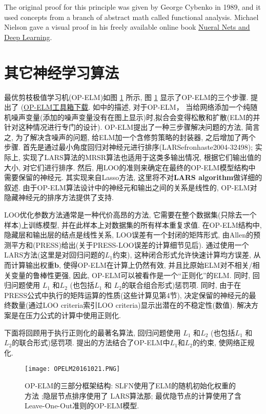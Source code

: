 The original proof for this principle was given by George Cybenko in 1989, and it used concepts from a branch of abstract math called functional analysis. Michael Nielson gave a visual proof in his freely available online book \href{http://neuralnetworksanddeeplearning.com/chap4.html}{Nueral Nets and Deep Learning}.
\section{其它神经学习算法}
最优剪枝极值学习机(OP-ELM)如图 \ref{OPELM20161021fig2} 所示, 图 \ref{OPELM20161021fig2} 显示了OP-ELM的三个步骤.
提出了 (\href{http://www.cis.hut.fi/projects/eiml/research/download}{OP-ELM工具箱下载}.
如\cite{Miche2008OP, Miche2008A, Miche2010OP}中的描述, 对于OP-ELM， 当给网络添加一个纯随机噪声变量(添加的噪声变量没有在图上显示)时,拟合会变得松散和扩散(ELM的并针对这种情况进行专门的设计).
OP-ELM提出了一种三步骤解决问题的方法, 简言之, 为了解决含噪声的问题, 给ELM加一个含修剪策略的封装器, 之后增加了两个步骤.
首先是通过最小角度回归对神经元进行排序(LARS{efronhaste2004-32498});
实际上, 实现了LARS算法的MRSR算法\cite{SimiläTikka2005-32497}也适用于这类多输出情况, 根据它们输出值的大小, 对它们进行排序.
然后, 用LOO的准则来确定在最终的OP-ELM模型结构中需要保留的神经元.
其实现来自Lasso方法, 这里将不对\textbf{LARS algorithm}做详细的叙述.
由于OP-ELM算法设计中的神经元和输出之间的关系是线性的, OP-ELM对隐藏神经元的排序方法提供了支持.

LOO优化参数方法通常是一种代价高昂的方法, 它需要在整个数据集(只除去一个样本)上训练模型, 并在此样本上对数据集的所有样本重复求值.
在OP-ELM结构中, 隐藏层和输出层的结点是线性关系, LOO误差有一个封闭的矩阵形式, 由Allen的预测平方和(PRESS)给出(关于PRESS-LOO误差的计算细节见后).
通过使用一个LARS方法(这里是对回归问题的$L_1$约束), 这种闭合形式允许快速计算均方误差, 从而计算输出权重$\bm b$, 使得OP-ELM在计算上仍然有效, 并且比原始ELM对不相关/相关变量的鲁棒性更强, 因此, OP-ELM可以被看作是一个“正则化”的ELM.
同时, 回归问题使用 $L_1$ 和$L_2$ (也包括$L_1$ 和 $L_2$的联合组合形式)惩罚项.
同时, 由于在PRESS公式中执行的矩阵运算的性质(这些计算见第4节), 决定保留的神经元的最终数量(通过LOO criteria索引LOO criteria)显示出潜在的不稳定性(数值).
解决方案是在压力公式的计算中使用正则化.

下面将回顾用于执行正则化的最著名算法, 回归问题使用 $L_1$ 和$L_2$ (也包括$L_1$ 和 $L_2$的联合形式)惩罚项.
提出的方法结合了OP-ELM中$L_1$和$L_2$的约束, 使网络正规化.
\begin{figure}[t]
    \begin{center}
    \texttt{[image: OPELM20161021.PNG]}
    \end{center}
    \caption{OP-ELM的三部分框架结构: SLFN使用了ELM的随机初始化权重的方法 ;隐层节点排序使用了 LARS算法那; 最优隐节点的计算使用了含Leave-One-Out准则的OP-ELM模型.}
    \label{OPELM20161021fig2}
\end{figure}
